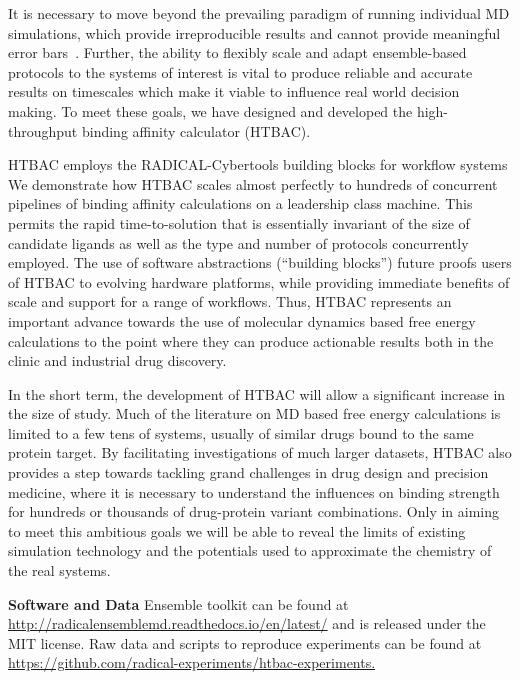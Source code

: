 
It is necessary to move beyond the prevailing paradigm of running individual
MD simulations, which provide irreproducible results and cannot provide
meaningful error bars~\cite{Bhati2017}. Further, the ability to flexibly
scale and adapt ensemble-based protocols to the systems of interest is vital
to produce reliable and accurate results on timescales which make it viable
to influence real world decision making. To meet these goals, we have
designed and developed the high-throughput binding affinity calculator
(HTBAC).

HTBAC employs the RADICAL-Cybertools building blocks for workflow systems
We demonstrate how HTBAC  scales almost perfectly to hundreds
of concurrent pipelines of binding affinity calculations on a leadership class
machine. This permits the rapid time-to-solution that is essentially invariant
of the size of candidate ligands as well as the type and number of protocols
concurrently employed. The use of software abstractions (``building blocks'')
future proofs users of HTBAC to evolving hardware platforms, while providing
immediate benefits of scale and support for a range of workflows. Thus, HTBAC
represents an important advance towards the use of molecular dynamics based
free energy calculations to the point where they can produce actionable
results both in the clinic and industrial drug discovery.

In the short term, the development of HTBAC will allow a significant increase
in the size of study. Much of the literature on MD based free energy
calculations is limited to a few tens of systems, usually of similar drugs
bound to the same protein target. By facilitating investigations of much
larger datasets, HTBAC also provides a step towards tackling grand challenges
in drug design and precision medicine, where it is necessary to understand the
influences on binding strength for hundreds or thousands of drug-protein
variant combinations. Only in aiming to meet this ambitious goals we will be
able to reveal the limits of existing simulation technology and the
potentials used to approximate the chemistry of the real systems.

\footnotesize \textbf{Software and Data} Ensemble toolkit can be found at
\url{http://radicalensemblemd.readthedocs.io/en/latest/} and is released
under the MIT license. Raw data and scripts to reproduce experiments can be
found at \url{https://github.com/radical-experiments/htbac-experiments.}
